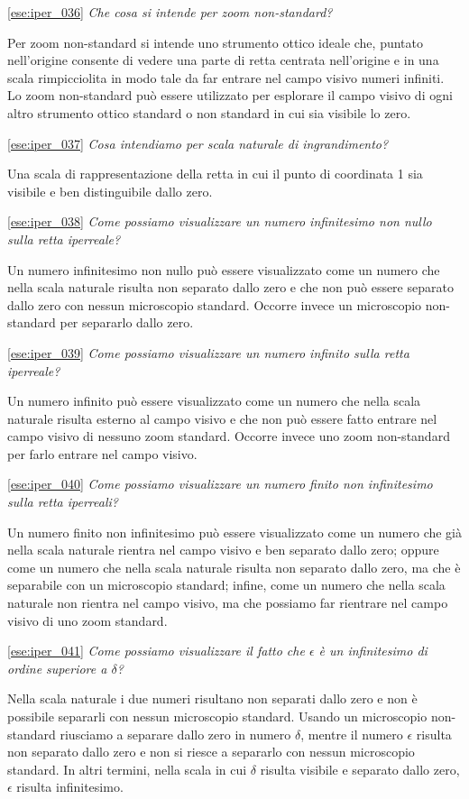 \ref{ese:iper_036} 
\emph{Che cosa si intende per zoom non-standard?}

Per zoom non-standard si intende uno strumento ottico ideale che, puntato 
nell'origine consente di vedere una parte di retta centrata nell'origine e in 
una scala rimpicciolita in modo tale da far entrare nel campo visivo numeri 
infiniti. Lo zoom non-standard può essere utilizzato per esplorare il campo 
visivo di ogni altro strumento ottico standard o non standard in cui sia 
visibile lo zero.

\ref{ese:iper_037} 
\emph{Cosa intendiamo per scala naturale di ingrandimento?}

Una scala di rappresentazione della retta in cui il punto di coordinata 1 sia 
visibile e ben distinguibile dallo zero.

\ref{ese:iper_038} 
\emph{Come possiamo visualizzare un numero infinitesimo non nullo sulla retta
iperreale?}

Un numero infinitesimo non nullo può essere visualizzato come un numero che 
nella scala naturale risulta non separato dallo zero e che non può essere 
separato dallo zero con nessun microscopio standard. Occorre invece un 
microscopio non-standard per separarlo dallo zero.

\ref{ese:iper_039} 
\emph{Come possiamo visualizzare un numero infinito sulla retta iperreale?}

Un numero infinito può essere visualizzato come un numero che nella scala 
naturale risulta esterno al campo visivo e che non può essere fatto entrare nel 
campo visivo di nessuno zoom standard. Occorre invece uno zoom non-standard per 
farlo entrare nel campo visivo.

\ref{ese:iper_040} 
\emph{Come possiamo visualizzare un numero finito non infinitesimo sulla retta
iperreali?}

Un numero finito non infinitesimo può essere visualizzato come un numero che 
già nella scala naturale rientra nel campo visivo e ben separato dallo zero; 
oppure come un numero che nella scala naturale risulta non separato dallo zero, 
ma che è separabile con un microscopio standard; infine, come un numero che 
nella scala naturale non rientra nel campo visivo, ma che possiamo far 
rientrare nel campo visivo di uno zoom standard.

\ref{ese:iper_041} 
\emph{Come possiamo visualizzare il fatto che \(\epsilon\) è un infinitesimo di 
ordine superiore a \(\delta\)?}

Nella scala naturale i due numeri risultano non separati dallo zero e non è 
possibile separarli con nessun microscopio standard. Usando un microscopio 
non-standard riusciamo a separare dallo zero in numero \(\delta\), mentre il 
numero \(\epsilon\) risulta non separato dallo zero e non si riesce a separarlo 
con nessun microscopio standard. In altri termini, nella scala in cui 
\(\delta\) risulta visibile e separato dallo zero, 
\(\epsilon\) risulta infinitesimo.

